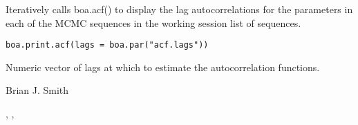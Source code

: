 \begin{Description}\relax
Iteratively calls boa.acf() to display the lag autocorrelations for the 
parameters in each of the MCMC sequences in the working session list of 
sequences.
\end{Description}
\begin{Usage}
\begin{verbatim}
boa.print.acf(lags = boa.par("acf.lags"))
\end{verbatim}
\end{Usage}
\begin{Arguments}
\begin{ldescription}
\item[\code{lags}] Numeric vector of lags at which to estimate the autocorrelation 
functions.
\end{ldescription}
\end{Arguments}
\begin{Author}\relax
Brian J. Smith
\end{Author}
\begin{SeeAlso}\relax
{}, ,
\end{SeeAlso}

